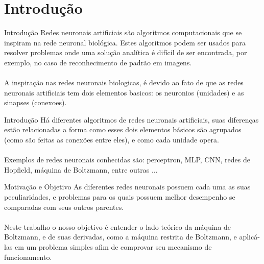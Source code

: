 \section{Introdução}%

\begin{frame}{Introdução}%
  \justifying%
  Redes neuronais artificiais são algoritmos computacionais que se inspiram na rede neuronal biológica.
  Estes algoritmos podem ser usados para resolver problemas onde uma solução analítica é difícil de ser encontrada, por exemplo, no caso de reconhecimento de padrão em imagens.
  \\~\\
  A inspiração nas redes neuronais biologicas, é devido ao fato de que as redes neuronais artificiais tem dois elementos basicos: os neuronios (unidades) e as sinapses (conexoes).
\end{frame}

\begin{frame}{Introdução}%
  \justifying%
  Há diferentes algoritmos de redes neuronais artificiais, suas diferenças estão relacionadas a forma como esses dois elementos básicos são agrupados (como são feitas as conexões entre eles), e como cada unidade opera.
  \\~\\
  Exemplos de redes neuronais conhecidas são: perceptron, MLP, CNN, redes de Hopfield, máquina de Boltzmann, entre outras $\dots$
\end{frame}

\begin{frame}{Motivação e Objetivo}%
  \justifying%
  As diferentes redes neuronais possuem cada uma as suas peculiaridades, e problemas para os quais possuem melhor desempenho se comparadas com seus outros parentes.
  \\~\\
  Neste trabalho o nosso objetivo é entender o lado teórico da máquina de Boltzmann, e de suas derivadas, como a máquina restrita de Boltzmann, e aplicá-las em um problema simples afim de comprovar seu mecanismo de funcionamento.
\end{frame}
